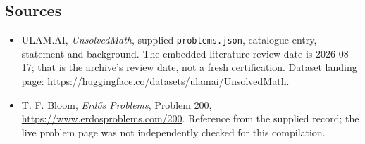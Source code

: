 \documentclass[11pt,a4paper]{article}
\begin{document}
\subsection{Sources}

{\small

\begin{itemize}

\item[\hypertarget{source:statement:1}{S1}] ULAM.AI, \emph{UnsolvedMath}, supplied \texttt{problems.json}, catalogue entry, statement and background. The embedded literature-review date is 2026-08-17; that is the archive’s review date, not a fresh certification. Dataset landing page: \url{https://huggingface.co/datasets/ulamai/UnsolvedMath}.

\item[\hypertarget{source:statement:2}{S2}] T. F. Bloom, \emph{Erdős Problems}, Problem 200, \url{https://www.erdosproblems.com/200}. Reference from the supplied record; the live problem page was not independently checked for this compilation.

\end{itemize}

}

\label{end:statement}
\end{document}
